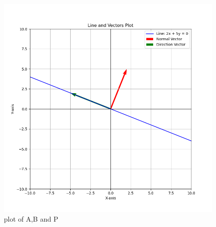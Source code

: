 \documentclass[journal]{IEEEtran}
\begin{document}
 \begin{figure}[h!]
  \centering
  \includegraphics[width=1\linewidth]{fig/fig.png}
  \caption{plot of A,B and P}
 \end{figure}
\end{document}
